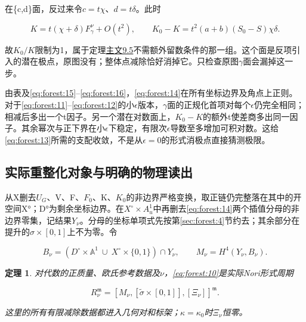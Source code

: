\documentclass[11pt,a4paper,oneside]{ctexart}
\theoremstyle{cnplain}
\newtheorem{theorem}{定理}[section]
\theoremstyle{definition}
\theoremstyle{remark}
\numberwithin{equation}{section}
\newcommand{\otherref}[2]{\href{#1.pdf}{#2}}
\begin{document}
在\{c,d\}面，反过来令\(c=t\chi \)、\(d=t\delta \)。此时

\begin{equation}
K=t(\chi+\delta)F_\gamma^\nu+O(t^2),\qquad
 K_0-K=t^2(a+b)(S_0-S)\chi\delta.                              \label{eq:forest:16}
\end{equation}

故\(K_0/K\)限制为1，属于定理\otherref{feynman_periods_long_paper}{主文9.5}不需额外留数条件的那一组。这个面是反项引入的潜在极点，原图没有；整体点减除恰好消掉它。只检查原图\(\gamma \)面会漏掉这一步。

由表及\eqref{eq:forest:15}--\eqref{eq:forest:16}，\eqref{eq:forest:14}在所有坐标边界及角点上正则。对于\eqref{eq:forest:11}--\eqref{eq:forest:12}的小\(\epsilon \)版本，\(\gamma \)面的正规化首项对每个\(\epsilon \)仍完全相同；相减后多出一个t因子。另一个潜在对数面上，\(K_0- K\)的额外t使差商多出同一因子。其余幂次与正下界在小\(\epsilon \)下稳定，有限次\(\epsilon \)导数至多增加可积对数。这给\eqref{eq:forest:13}所需的支配收敛，不是从\(\epsilon =0\)的形式消极点直接猜测极限。


\subsection{实际重整化对象与明确的物理读出}\label{sec:forest:5}

从X删去\(U_G\)、V、F、\(F_0\)、K、\(K_0\)的非边界严格变换，取正链仍完整落在其中的开空间X°；D°为剩余坐标边界。在\(X^\circ\times A^{1}_u\)中再删去\eqref{eq:forest:14}两个插值分母的非边界零集，记结果\(Y_\nu \)。分母的坐标单项式先按第\ref{sec:forest:4}节约去；其余部分在提升的\(\sigma \times [0,1]\)上不为零。令

\begin{equation}
B_\nu=(D^\circ\times\mathbb A^1
            \ \cup\ X^\circ\times\{0,1\})\cap Y_\nu,\qquad
 M_\nu=H^4(Y_\nu,B_\nu).                                       \label{eq:forest:17}
\end{equation}

\begin{theorem}

\label{thm:forest:5.1} 对代数的正质量、欧氏参考数据及\(\nu \)，\eqref{eq:forest:10}是实际Nori形式周期

\begin{equation}
R_\nu^{\mathfrak m}
       =[M_\nu,[\widetilde\sigma\times[0,1]],[\Xi_\nu]]^{\mathfrak m}.       \label{eq:forest:18}
\end{equation}

这里的所有有限减除数据都进入几何对和标架；\(\kappa =\kappa _0\)时\(\Xi _\nu \)恒零。

\end{theorem}
\end{document}
